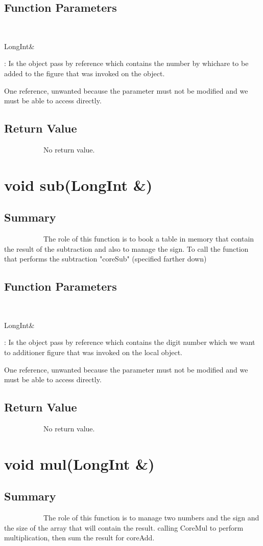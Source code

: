 \documentclass[11pt]{report}
\begin{document}
	\subsection{Function Parameters}
~~~~~~~~~~~\begin{bf}LongInt\&\end{bf}: Is the object pass by reference which contains the number by whichare to be added to the figure that was invoked on the object.

One reference, unwanted because the parameter must not be modified and we must be able to access directly.
	\subsection{Return Value}
~~~~~~~~~~~No return value.

\section{void sub(LongInt \&)}
	\subsection{Summary}
~~~~~~~~~~~The role of this function is to book a table in memory that contain the result of the subtraction
and also to manage the sign.
To call the function that performs the subtraction "coreSub" (specified farther down)
	\subsection{Function Parameters}
~~~~~~~~~~~\begin{bf}LongInt\&\end{bf}: Is the object pass by reference which contains the digit number which
we want to additioner figure that was invoked on the local object.

One reference, unwanted because the parameter must not be modified and
we must be able to access directly.

	\subsection{Return Value}
~~~~~~~~~~~No return value.


\section{void mul(LongInt \&)}
	\subsection{Summary}
~~~~~~~~~~~The role of this function is to manage two numbers and
the sign and the size of the array that will contain the result.
calling CoreMul to perform multiplication, then sum the result for coreAdd.
\end{document}
